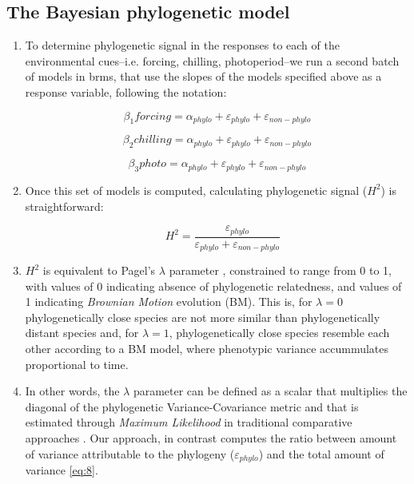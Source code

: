 \documentclass{article}\usepackage[]{graphicx}\usepackage[]{color}
\begin{document}
\subsection*{The Bayesian phylogenetic model}
\begin{enumerate}
\item To determine phylogenetic signal in the responses to each of the environmental cues--i.e. forcing, chilling, photoperiod--we run a second batch of models in brms, that use the slopes of the models specified above as a response variable, following the notation:



\begin{equation}
\label{eq:5} 
\beta_{1}forcing = \alpha_{phylo} + \varepsilon_{phylo} + \varepsilon_{non-phylo}
\end{equation}

\begin{equation}
\label{eq:6} 
\beta_{2}chilling = \alpha_{phylo} + \varepsilon_{phylo} + \varepsilon_{non-phylo}
\end{equation}

\begin{equation}
\label{eq:7} 
\beta_{3}photo = \alpha_{phylo} + \varepsilon_{phylo} + \varepsilon_{non-phylo}
\end{equation}

\item Once this set of models is computed, calculating phylogenetic signal ($H^{2}$) is straightforward:

\begin{equation}
\label{eq:8} 
\quad   H^{2} = \frac{\varepsilon_{phylo}}{\varepsilon_{phylo} + \varepsilon_{non-phylo}}
\end{equation}

\item $H^{2}$ is equivalent to Pagel's \cite{pagel1999inferring} $\lambda$ parameter \citep{housworth2004phylogenetic}, constrained to range from 0 to 1, with values of 0 indicating absence of phylogenetic relatedness, and values of 1 indicating \emph{Brownian Motion} evolution (BM). This is, for $\lambda = 0$ phylogenetically close species are not more similar than phylogenetically distant species and, for $\lambda = 1$, phylogenetically close species resemble each other according to a BM model, where phenotypic variance accummulates proportional to time.

\item In other words, the $\lambda$ parameter can be defined as a scalar that multiplies the diagonal of the phylogenetic Variance-Covariance metric and that is estimated through \emph{Maximum Likelihood} in traditional comparative approaches \citep{freckleton2002phylogenetic}. Our approach, in contrast computes the ratio between amount of variance attributable to the phylogeny ($\varepsilon_{phylo}$) and the total amount of variance \ref{eq:8}.


\end{enumerate}
\end{document}
